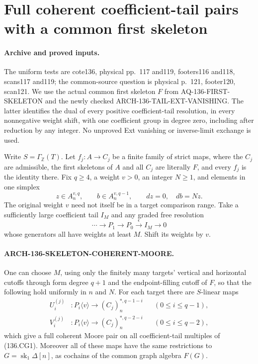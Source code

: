 \section{Full coherent coefficient-tail pairs with a common first skeleton}
\label{sec:136-coherent-common-skeleton}

\paragraph{Archive and proved inputs.}
The uniform tests are cote136, physical pp.~117 and119,
footers116 and118, scans117 and119; the common-source question
is physical p.~121, footer120, scan121. We use the actual
common first skeleton \(F\) from AQ-136-FIRST-SKELETON and
the newly checked ARCH-136-TAIL-EXT-VANISHING. The latter
identifies the dual of every positive coefficient-tail resolution,
in every nonnegative weight shift, with one coefficient group
in degree zero, including after reduction by any integer.
No unproved Ext vanishing or inverse-limit exchange is used.

Write \(S=\Gamma_{\mathbb Z}(T)\). Let
\(f_j:A\to C_j\) be a finite family of strict maps, where
the \(C_j\) are admissible, the first skeletons of \(A\)
and all \(C_j\) are literally \(F\), and every \(f_j\)
is the identity there. Fix \(q\geq4\), a weight \(v>0\),
an integer \(N\geq1\), and elements in one simplex
\[
 z\in A_n^{v,q},\qquad b\in A_n^{v,q-1},\qquad
                         dz=0,\quad db=Nz.              \tag{136.CG1}
\]
The original weight \(v\) need not itself be in a target
comparison range. Take a sufficiently large coefficient tail
\(I_M\) and any graded free resolution
\[
 \cdots\longrightarrow P_1\longrightarrow P_0
                 \xrightarrow{\epsilon}I_M\longrightarrow0
                                                               \tag{136.CG2}
\]
whose generators all have weights at least \(M\).
Shift its weights by \(v\).

\paragraph{ARCH-136-SKELETON-COHERENT-MOORE.}
One can choose \(M\), using only the finitely many targets'
vertical and horizontal cutoffs through form degree \(q+1\)
and the endpoint-filling cutoff of \(F\), so that the
following hold uniformly in \(n\) and \(N\). For each
target there are \(S\)-linear maps
\[
 \begin{aligned}
 U_i^{(j)} &:P_i\langle v\rangle\longrightarrow
                         (C_j)_n^{*,q-1-i}
                              &&(0\leq i\leq q-1),\\
 V_i^{(j)} &:P_i\langle v\rangle\longrightarrow
                         (C_j)_n^{*,q-2-i}
                              &&(0\leq i\leq q-2),
 \end{aligned}                                             \tag{136.CG3}
\]
which give a full coherent Moore pair on all coefficient-tail
multiples of (136.CG1). Moreover all of these maps have
the same restrictions to
\(G=\operatorname{sk}_1\Delta[n]\), as cochains of the
common graph algebra \(F(G)\).

